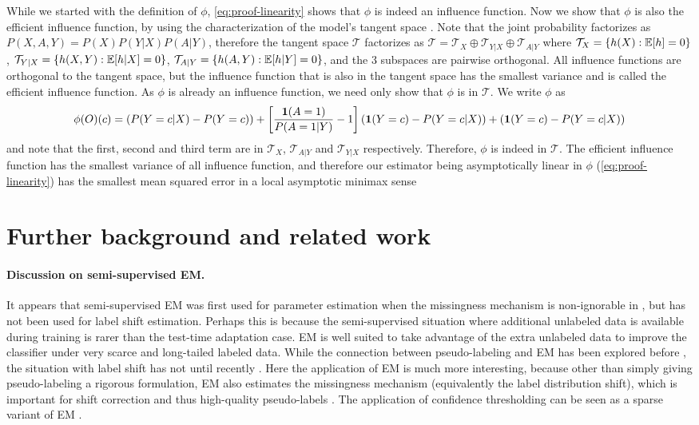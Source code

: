 While we started with the definition of $\phi$, \cref{eq:proof-linearity} shows that $\phi$ is indeed an influence function. Now we show that $\phi$ is also the efficient influence function, by using the characterization of the model's tangent space \cite{tsiatis-missingdata}. Note that the joint probability factorizes as $P(X,A,Y) = P(X)P(Y|X)P(A|Y)$, therefore the tangent space $\mathcal{T}$ factorizes as $\mathcal{T} = \mathcal{T}_{X} \oplus \mathcal{T}_{Y|X} \oplus \mathcal{T}_{A|Y}$ where $\mathcal{T}_X = \{h(X): \mathbb{E}[h] = 0\}$, $\mathcal{T}_{Y|X} = \{h(X,Y): \mathbb{E}[h|X] = 0\}$, $\mathcal{T}_{A|Y} = \{h(A,Y): \mathbb{E}[h|Y] = 0\}$, and the 3 subspaces are pairwise orthogonal. All influence functions are orthogonal to the tangent space, but the influence function that is also in the tangent space has the smallest variance and is called the efficient influence function. As $\phi$ is already an influence function, we need only show that $\phi$ is in $\mathcal{T}$. We write $\phi$ as
\begin{equation}
\phi(O)(c) = (P(Y=c|X) - P(Y=c)) + \left[\frac{\textbf{1}(A=1)}{P(A=1|Y)} - 1\right](\textbf{1}(Y=c) - P(Y=c|X)) + (\textbf{1}(Y=c) - P(Y=c|X))
\end{equation}
and note that the first, second and third term are in $\mathcal{T}_X$, $\mathcal{T}_{A|Y}$ and $\mathcal{T}_{Y|X}$ respectively. Therefore, $\phi$ is indeed in $\mathcal{T}$. The efficient influence function has the smallest variance of all influence function, and therefore our estimator being asymptotically linear in $\phi$ (\cref{eq:proof-linearity}) has the smallest mean squared error in a local asymptotic minimax sense \cite{kennedy-dr, asymptoticstatistics}

\section{Further background and related work}
\paragraph{Discussion on semi-supervised EM.}
It appears that semi-supervised EM was first used for parameter estimation when the missingness mechanism is non-ignorable in \cite{ibrahim1996parameter}, but has not been used for label shift estimation.
Perhaps this is because the semi-supervised situation where additional unlabeled data is available during training is rarer than the test-time adaptation case. EM is well suited to take advantage of the extra unlabeled data to improve the classifier under very scarce and long-tailed labeled data. While the connection between pseudo-labeling and EM has been explored before \cite{entropyminimization}, the situation with label shift has not until recently \cite{simpro}. Here the application of EM is much more interesting, because other than simply giving pseudo-labeling a rigorous formulation, EM also estimates the missingness mechanism (equivalently the label distribution shift), which is important for shift correction and thus high-quality pseudo-labels \cite{acr}. The application of confidence thresholding can be seen as a sparse variant of EM \cite{neal1998view}.

